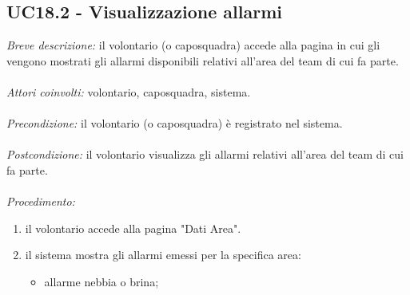 \subsection{UC18.2 - Visualizzazione allarmi}
\textit{Breve descrizione:} il volontario (o caposquadra) accede alla pagina in cui gli vengono mostrati gli allarmi disponibili relativi all'area del team di cui fa parte. 
\\
\\
\textit{Attori coinvolti:} volontario, caposquadra, sistema.
\\
\\
\textit{Precondizione:} il volontario (o caposquadra) è registrato nel sistema.
\\
\\
\textit{Postcondizione:} il volontario visualizza gli allarmi relativi all'area del team di cui fa parte.
\\
\\
\textit{Procedimento:}
\begin{enumerate}
	\item il volontario accede alla pagina "Dati Area".
	\item il sistema mostra gli allarmi emessi per la specifica area:
	\begin{itemize}
		\item allarme nebbia o brina;
	\end{itemize}
\end{enumerate}
